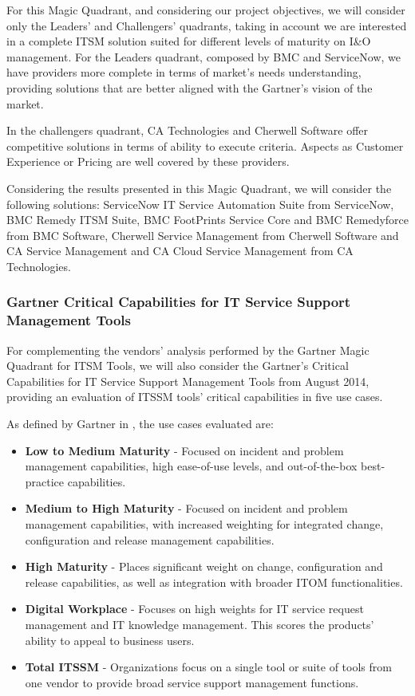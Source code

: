 For this Magic Quadrant, and considering our project objectives, we will consider only the Leaders' and Challengers' quadrants, taking in account we are interested in a complete ITSM solution suited for different levels of maturity on I\&O management. For the Leaders quadrant, composed by BMC and ServiceNow, we have providers more complete in terms of market's needs understanding, providing solutions that are better aligned with the Gartner's vision of the market.\par 
In the challengers quadrant, CA Technologies and Cherwell Software offer competitive solutions in terms of ability to execute criteria. Aspects as Customer Experience or Pricing are well covered by these providers.\par
Considering the results presented in this Magic Quadrant, we will consider the following solutions: ServiceNow IT Service Automation Suite from ServiceNow, BMC Remedy ITSM Suite, BMC FootPrints Service Core and BMC Remedyforce from BMC Software, Cherwell Service Management from Cherwell Software and CA Service Management and CA Cloud Service Management from CA Technologies.\par

\subsubsection{Gartner Critical Capabilities for IT Service Support Management Tools}

For complementing the vendors' analysis performed by the Gartner Magic Quadrant for ITSM Tools, we will also consider the Gartner's Critical Capabilities for IT Service Support Management Tools from August 2014\cite{criticalCapabilitiesITSM}, providing an evaluation of ITSSM tools' critical capabilities in five use cases.\par
As defined by Gartner in \cite{criticalCapabilitiesITSM}, the use cases evaluated are:

\begin{itemize}
\item \textbf{Low to Medium Maturity} - Focused on incident and problem management capabilities, high ease-of-use levels, and out-of-the-box best-practice capabilities.
\item \textbf{Medium to High Maturity} - Focused on incident and problem management capabilities, with increased weighting for integrated change, configuration and release management capabilities.
\item \textbf{High Maturity} - Places significant weight on change, configuration and release capabilities, as well as integration with broader ITOM functionalities.
\item \textbf{Digital Workplace} - Focuses on high weights for IT service request management and IT knowledge management. This scores the products' ability to appeal to business users.
\item \textbf{Total ITSSM} - Organizations focus on a single tool or suite of tools from one vendor to provide broad service support management functions.
\end{itemize}

